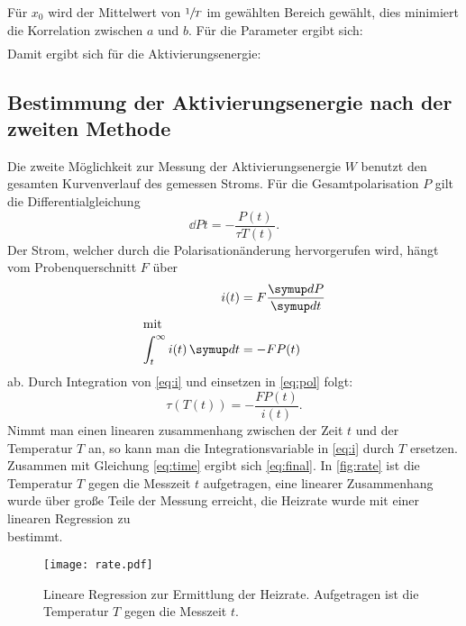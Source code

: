 Für $x_0$ wird der Mittelwert von $\sfrac{1}{T}$ im gewählten Bereich gewählt, dies minimiert die Korrelation zwischen $a$ und $b$.
Für die Parameter ergibt sich:
\begin{align}
  
\end{align}
Damit ergibt sich für die Aktivierungsenergie:
\begin{equation}
  
\end{equation}

\subsection{Bestimmung der Aktivierungsenergie nach der zweiten Methode}
Die zweite Möglichkeit zur Messung der Aktivierungsenergie $W$ benutzt den gesamten Kurvenverlauf des gemessen Stroms.
Für die Gesamtpolarisation $P$ gilt die Differentialgleichung
\begin{equation}
  \dd{P}{t} = - \frac{P(t)}{\tau{T(t)}}.
  \label{eq:pol}
\end{equation}
Der Strom, welcher durch die Polarisationänderung hervorgerufen wird, hängt vom Probenquerschnitt $F$ über
\begin{align}
  i(t) &= F \dd{P}{t} \\
  \shortintertext{mit}
  \int_t^{\infty} i(t) \dif{t} &= -FP(t)
  \label{eq:i}
\end{align}
ab.
Durch Integration von  \eqref{eq:i} und einsetzen in \eqref{eq:pol} folgt:
\begin{equation}
  \tau(T(t)) = -\frac{F P(t)}{i(t)}.
  \label{eq:tau_t}
\end{equation}
Nimmt man einen linearen zusammenhang zwischen der Zeit $t$ und der Temperatur $T$ an, so kann man die Integrationsvariable in \eqref{eq:i} durch $T$ ersetzen.
Zusammen mit Gleichung \eqref{eq:time} ergibt sich \eqref{eq:final}.
In \autoref{fig:rate} ist die Temperatur $T$ gegen die Messzeit $t$ aufgetragen, eine linearer Zusammenhang wurde über große Teile der
Messung erreicht, die Heizrate wurde mit einer linearen Regression
zu 
\begin{equation}
  
\end{equation}
bestimmt.

\begin{figure}
  \centering
  \texttt{[image: rate.pdf]}
  \caption{Lineare Regression zur Ermittlung der Heizrate. Aufgetragen ist die Temperatur $T$ gegen die Messzeit $t$.}
  \label{fig:rate}
\end{figure}

